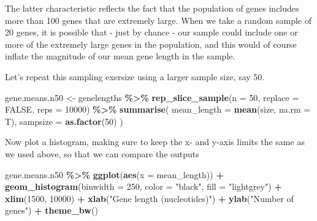 \documentclass[
]{book}
\newenvironment{Shaded}{\begin{snugshade}}{\end{snugshade}}
\newcommand{\AttributeTok}[1]{\textcolor[rgb]{0.13,0.29,0.53}{#1}}
\newcommand{\ConstantTok}[1]{\textcolor[rgb]{0.56,0.35,0.01}{#1}}
\newcommand{\DecValTok}[1]{\textcolor[rgb]{0.00,0.00,0.81}{#1}}
\newcommand{\FunctionTok}[1]{\textcolor[rgb]{0.13,0.29,0.53}{\textbf{#1}}}
\newcommand{\NormalTok}[1]{#1}
\newcommand{\OtherTok}[1]{\textcolor[rgb]{0.56,0.35,0.01}{#1}}
\newcommand{\SpecialCharTok}[1]{\textcolor[rgb]{0.81,0.36,0.00}{\textbf{#1}}}
\newcommand{\StringTok}[1]{\textcolor[rgb]{0.31,0.60,0.02}{#1}}
\begin{document}
The latter characteristic reflects the fact that the population of genes includes more than 100 genes that are extremely large. When we take a random sample of 20 genes, it is possible that - just by chance - our sample could include one or more of the extremely large genes in the population, and this would of course inflate the magnitude of our mean gene length in the sample.

Let's repeat this sampling exersize using a larger sample size, say 50.

\begin{Shaded}
\begin{Highlighting}[]
\NormalTok{gene.means.n50 }\OtherTok{\textless{}{-}}\NormalTok{ genelengths }\SpecialCharTok{\%\textgreater{}\%}
  \FunctionTok{rep\_slice\_sample}\NormalTok{(}\AttributeTok{n =} \DecValTok{50}\NormalTok{, }\AttributeTok{replace =} \ConstantTok{FALSE}\NormalTok{, }\AttributeTok{reps =} \DecValTok{10000}\NormalTok{) }\SpecialCharTok{\%\textgreater{}\%}
  \FunctionTok{summarise}\NormalTok{(}
    \AttributeTok{mean\_length =} \FunctionTok{mean}\NormalTok{(size, }\AttributeTok{na.rm =}\NormalTok{ T),}
    \AttributeTok{sampsize =} \FunctionTok{as.factor}\NormalTok{(}\DecValTok{50}\NormalTok{)}
\NormalTok{  )}
\end{Highlighting}
\end{Shaded}

Now plot a histogram, making sure to keep the x- and y-axis limits the same as we used above, so that we can compare the outputs

\begin{Shaded}
\begin{Highlighting}[]
\NormalTok{gene.means.n50 }\SpecialCharTok{\%\textgreater{}\%}
\FunctionTok{ggplot}\NormalTok{(}\FunctionTok{aes}\NormalTok{(}\AttributeTok{x =}\NormalTok{ mean\_length)) }\SpecialCharTok{+}
  \FunctionTok{geom\_histogram}\NormalTok{(}\AttributeTok{binwidth =} \DecValTok{250}\NormalTok{, }\AttributeTok{color =} \StringTok{"black"}\NormalTok{, }\AttributeTok{fill =} \StringTok{"lightgrey"}\NormalTok{) }\SpecialCharTok{+}
  \FunctionTok{xlim}\NormalTok{(}\DecValTok{1500}\NormalTok{, }\DecValTok{10000}\NormalTok{) }\SpecialCharTok{+}
  \FunctionTok{xlab}\NormalTok{(}\StringTok{"Gene length (nucleotides)"}\NormalTok{) }\SpecialCharTok{+}
  \FunctionTok{ylab}\NormalTok{(}\StringTok{"Number of genes"}\NormalTok{) }\SpecialCharTok{+}
  \FunctionTok{theme\_bw}\NormalTok{()}
\end{Highlighting}
\end{Shaded}
\end{document}
